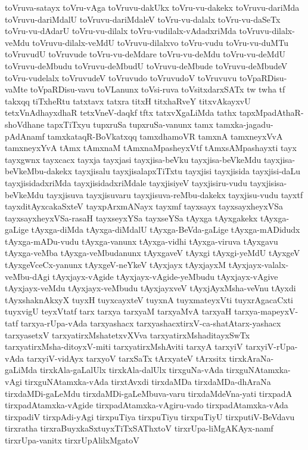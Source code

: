 {toVruva-satayx
toVru-vAga
toVruvu-dakUkx
toVru-vu-dakekx
toVruvu-dariMda
toVruvu-dariMdalU
toVruvu-dariMdaleV
toVru-vu-dalalx
toVru-vu-daSeTx
toVru-vu-dAdarU
toVru-vu-dilalx
toVru-vudilalx-vAdadxriMda
toVruvu-dilalx-veMdu
toVruvu-dilalx-veMdU
toVruvu-dilalxvo
toVru-vudu
toVru-vu-duMTu
toVruvudU
toVruvude
toVru-vu-deMdare
toVru-vu-deMdu
toVru-vu-deMdU
toVruvu-deMbudu
toVruvu-deMbudU
toVruvu-deMbude
toVruvu-deMbudeV
toVru-vudelalx
toVruvudeV
toVruvudo
toVruvudoV
toVruvuvu
toVpaRDisu-vaMte
toVpaRDisu-vavu
toVLanunx
toVsi-ruva
toVsitxdarxSATx
tw
twha
tf
takxqq
tiTxheRtu
tatxtavx
tatxra
titxH
titxhaRveY
titxvAkayxvU
tetxVnAdhayxdhaR
tetxVneV-daqkf
tftx
tatxvXgaLiMda
tathx
tapxMpadAthaR-shoVdhane
tapxTiTxyu
tupxruSa
tupxruSa-vanunx
tamx
tamxka-jagadu-pAdAnamf
tamxkataqR-BoVkatxqq
tamxdhamoVR
tamxnA
tamxneyxVvA
tamxneyxYvA
tAmx
tAmxnaM
tAmxnaMpasheyxVtf
tAmxsAMpashayxti
tayx
tayxgwnx
tayxcacx
tayxja
tayxjasi
tayxjisa-beVku
tayxjisa-beVkeMdu
tayxjisa-beVkeMbu-dakekx
tayxjisalu
tayxjisalapxTiTxtu
tayxjisi
tayxjisida
tayxjisi-daLu
tayxjisidadxriMda
tayxjisidadxriMdale
tayxjisiyeV
tayxjisiru-vudu
tayxjisisa-beVkeMdu
tayxjisuva
tayxjisuvaru
tayxjisuva-reMbu-dakekx
tayxjisu-vudu
tayxtf
tayxditAyxcakaSxteV
tayxpArxmANayx
tayxmf
tayxsayx
tayxsayxheyxVSa
tayxsayxheyxVSa-rasaH
tayxseyxYSa
tayxseYSa
tAyxga
tAyxgakekx
tAyxga-gaLige
tAyxga-diMda
tAyxga-diMdalU
tAyxga-BeVda-gaLige
tAyxga-mADidudx
tAyxga-mADu-vudu
tAyxga-vanunx
tAyxga-vidhi
tAyxga-viruva
tAyxgavu
tAyxga-veMba
tAyxga-veMbudanunx
tAyxgaveV
tAyxgi
tAyxgi-yeMdU
tAyxgeV
tAyxgeVceCx-yanunx
tAyxgeV-neYkeV
tAyxjayx
tAyxjayxM
tAyxjayx-valalx-veMbu-dAgi
tAyxjayx-vAgide
tAyxjayx-vAgide-yeMbudu
tAyxjayx-vAgive
tAyxjayx-veMdu
tAyxjayx-veMbudu
tAyxjayxveV
tAyxjAyxMsha-veVnu
tAyxdi
tAyxshaknAkxyX
tuyxH
tuyxcayxteV
tuyxnA
tuyxmateyxVti
tuyxrAgacaCxti
tuyxvigU
teyxVtatf
tarx
tarxya
tarxyaM
tarxyaMvA
tarxyaH
tarxya-mapeyxV-tatf
tarxya-rUpa-vAda
tarxyashacx
tarxyashacxtirxV-ca-shatAtarx-yashacx
tarxyasetxV
tarxyatirxMshatetxvXVva
tarxyatirxMshaditayxSwTx
tarxyatirxMsha-ditoyxV-miti
tarxyatirxMshAviti
tarxyA
tarxyiV
tarxyiV-rUpa-vAda
tarxyiV-vidAyx
tarxyoV
tarxSaTx
tArxyateV
tArxsitx
tirxkAraNa-gaLiMda
tirxkAla-gaLalUlx
tirxkAla-dalUlx
tirxguNa-vAda
tirxguNAtamxka-vAgi
tirxguNAtamxka-vAda
tirxtAvxdi
tirxdaMDa
tirxdaMDa-dhAraNa
tirxdaMDi-gaLeMdu
tirxdaMDi-gaLeMbuva-varu
tirxdaMdeVna-yati
tirxpadA
tirxpadAtamxka-vAgide
tirxpadAtamxka-vAgiru-vado
tirxpadAtamxka-vAda
tirxpadiV
tirxpAdi-yAgi
tirxpuTiya
tirxpuTiyu
tirxpuTiyU
tirxputiV-BeVdavu
tirxratha
tirxraBuyxkaSxtuyxTiTxSAThxtoV
tirxrUpa-liMgAKAyx-namf
tirxrUpa-vanitx
tirxrUpAlilxMgatoV
}
